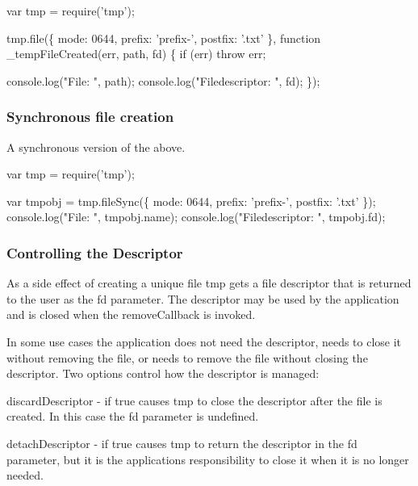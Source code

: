 \begin{DoxyCode}
var tmp = require('tmp');

tmp.file(\{ mode: 0644, prefix: 'prefix-', postfix: '.txt' \}, function \_tempFileCreated(err, path, fd) \{
  if (err) throw err;

  console.log("File: ", path);
  console.log("Filedescriptor: ", fd);
\});
\end{DoxyCode}


\subsubsection*{Synchronous file creation}

A synchronous version of the above.


\begin{DoxyCode}
var tmp = require('tmp');

var tmpobj = tmp.fileSync(\{ mode: 0644, prefix: 'prefix-', postfix: '.txt' \});
console.log("File: ", tmpobj.name);
console.log("Filedescriptor: ", tmpobj.fd);
\end{DoxyCode}


\subsubsection*{Controlling the Descriptor}

As a side effect of creating a unique file {\ttfamily tmp} gets a file descriptor that is returned to the user as the {\ttfamily fd} parameter. The descriptor may be used by the application and is closed when the {\ttfamily remove\+Callback} is invoked.

In some use cases the application does not need the descriptor, needs to close it without removing the file, or needs to remove the file without closing the descriptor. Two options control how the descriptor is managed\+:


\begin{DoxyItemize}
\item {\ttfamily discard\+Descriptor} -\/ if {\ttfamily true} causes {\ttfamily tmp} to close the descriptor after the file is created. In this case the {\ttfamily fd} parameter is undefined.
\item {\ttfamily detach\+Descriptor} -\/ if {\ttfamily true} causes {\ttfamily tmp} to return the descriptor in the {\ttfamily fd} parameter, but it is the application\textquotesingle{}s responsibility to close it when it is no longer needed.
\end{DoxyItemize}



